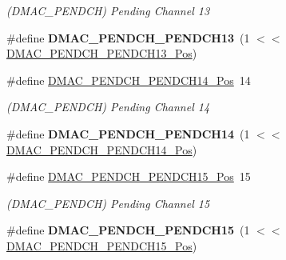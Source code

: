 \begin{DoxyCompactItemize}
\begin{DoxyCompactList}\small\item\em (D\+M\+A\+C\+\_\+\+P\+E\+N\+D\+C\+H) Pending Channel 13 \end{DoxyCompactList}\item 
\hypertarget{group___s_a_m_l21___d_m_a_c_ga1af22928a4a53088c2a21ebf0b11ba28}{}\#define {\bfseries D\+M\+A\+C\+\_\+\+P\+E\+N\+D\+C\+H\+\_\+\+P\+E\+N\+D\+C\+H13}~(1 $<$$<$ \hyperlink{group___s_a_m_l21___d_m_a_c_ga82977a6d782b963595005bbf6f47ef3f}{D\+M\+A\+C\+\_\+\+P\+E\+N\+D\+C\+H\+\_\+\+P\+E\+N\+D\+C\+H13\+\_\+\+Pos})\label{group___s_a_m_l21___d_m_a_c_ga1af22928a4a53088c2a21ebf0b11ba28}

\item 
\hypertarget{group___s_a_m_l21___d_m_a_c_ga6a2986e078eb8dd94c1aeecfc452c88e}{}\#define \hyperlink{group___s_a_m_l21___d_m_a_c_ga6a2986e078eb8dd94c1aeecfc452c88e}{D\+M\+A\+C\+\_\+\+P\+E\+N\+D\+C\+H\+\_\+\+P\+E\+N\+D\+C\+H14\+\_\+\+Pos}~14\label{group___s_a_m_l21___d_m_a_c_ga6a2986e078eb8dd94c1aeecfc452c88e}

\begin{DoxyCompactList}\small\item\em (D\+M\+A\+C\+\_\+\+P\+E\+N\+D\+C\+H) Pending Channel 14 \end{DoxyCompactList}\item 
\hypertarget{group___s_a_m_l21___d_m_a_c_gaa2d754c2f76f9221f4986b28a00d9b53}{}\#define {\bfseries D\+M\+A\+C\+\_\+\+P\+E\+N\+D\+C\+H\+\_\+\+P\+E\+N\+D\+C\+H14}~(1 $<$$<$ \hyperlink{group___s_a_m_l21___d_m_a_c_ga6a2986e078eb8dd94c1aeecfc452c88e}{D\+M\+A\+C\+\_\+\+P\+E\+N\+D\+C\+H\+\_\+\+P\+E\+N\+D\+C\+H14\+\_\+\+Pos})\label{group___s_a_m_l21___d_m_a_c_gaa2d754c2f76f9221f4986b28a00d9b53}

\item 
\hypertarget{group___s_a_m_l21___d_m_a_c_gaf8daabaf067fa80931a46aaedb0511ab}{}\#define \hyperlink{group___s_a_m_l21___d_m_a_c_gaf8daabaf067fa80931a46aaedb0511ab}{D\+M\+A\+C\+\_\+\+P\+E\+N\+D\+C\+H\+\_\+\+P\+E\+N\+D\+C\+H15\+\_\+\+Pos}~15\label{group___s_a_m_l21___d_m_a_c_gaf8daabaf067fa80931a46aaedb0511ab}

\begin{DoxyCompactList}\small\item\em (D\+M\+A\+C\+\_\+\+P\+E\+N\+D\+C\+H) Pending Channel 15 \end{DoxyCompactList}\item 
\hypertarget{group___s_a_m_l21___d_m_a_c_gaedd508ffc1b5343735b8ee7e23dbca2d}{}\#define {\bfseries D\+M\+A\+C\+\_\+\+P\+E\+N\+D\+C\+H\+\_\+\+P\+E\+N\+D\+C\+H15}~(1 $<$$<$ \hyperlink{group___s_a_m_l21___d_m_a_c_gaf8daabaf067fa80931a46aaedb0511ab}{D\+M\+A\+C\+\_\+\+P\+E\+N\+D\+C\+H\+\_\+\+P\+E\+N\+D\+C\+H15\+\_\+\+Pos})\label{group___s_a_m_l21___d_m_a_c_gaedd508ffc1b5343735b8ee7e23dbca2d}


\end{DoxyCompactItemize}
